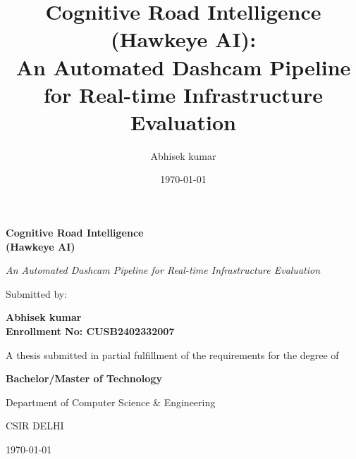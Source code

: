 \documentclass[12pt,a4paper]{report}
\title{\textbf{Cognitive Road Intelligence (Hawkeye AI): \\ An Automated Dashcam Pipeline for Real-time Infrastructure Evaluation}}
\author{Abhisek kumar}
\date{\today}
\begin{document}
\begin{titlepage}
    \centering
    \vspace*{2cm}
    
    {\Huge\bfseries Cognitive Road Intelligence \\ (Hawkeye AI)\par}
    \vspace{1cm}
    {\Large\itshape An Automated Dashcam Pipeline for Real-time Infrastructure Evaluation\par}
    
    \vspace{3cm}
    
    {\Large Submitted by:\par}
    {\Large\bfseries Abhisek kumar \\ Enrollment No: CUSB2402332007\par}
    
    \vfill
    
    {\Large A thesis submitted in partial fulfillment of the requirements for the degree of\par}
    {\Large\bfseries Bachelor/Master of Technology\par}
    
    \vspace{1cm}
    
    {\large Department of Computer Science \& Engineering\par}
    {\large CSIR DELHI\par}
    {\large \today\par}
\end{titlepage}

\end{document}
